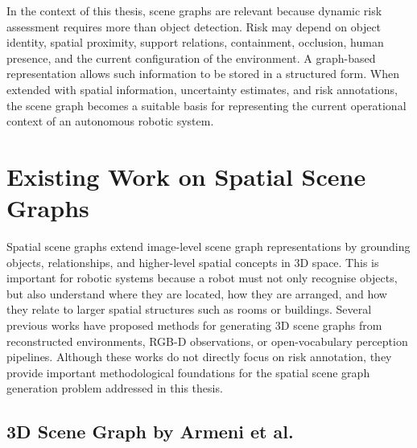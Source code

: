 {In the context of this thesis, scene graphs are relevant because dynamic risk assessment requires more than object detection. Risk may depend on object identity, spatial proximity, support relations, containment, occlusion, human presence, and the current configuration of the environment. A graph-based representation allows such information to be stored in a structured form. When extended with spatial information, uncertainty estimates, and risk annotations, the scene graph becomes a suitable basis for representing the current operational context of an autonomous robotic system.

}
























\section{Existing Work on Spatial Scene Graphs}

{\small

Spatial scene graphs extend image-level scene graph representations by grounding objects, relationships, and higher-level spatial concepts in 3D space. This is important for robotic systems because a robot must not only recognise objects, but also understand where they are located, how they are arranged, and how they relate to larger spatial structures such as rooms or buildings. Several previous works have proposed methods for generating 3D scene graphs from reconstructed environments, RGB-D observations, or open-vocabulary perception pipelines. Although these works do not directly focus on risk annotation, they provide important methodological foundations for the spatial scene graph generation problem addressed in this thesis.

}

\subsection{3D Scene Graph by Armeni et al.}

